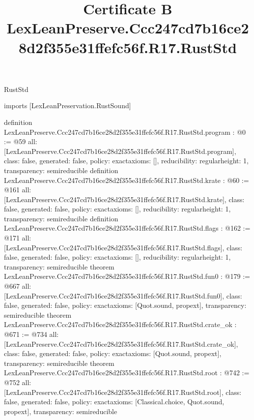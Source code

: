 \begin{lexlean}{RustStd}
\title{Certificate B LexLeanPreserve.Ccc247cd7b16ce28d2f355e31ffefc56f.R17.RustStd}
\begin{coremodule}
imports [LexLeanPreservation.RustSound]

definition LexLeanPreserve.Ccc247cd7b16ce28d2f355e31ffefc56f.R17.RustStd.program : @0 := @59 {
  all: [LexLeanPreserve.Ccc247cd7b16ce28d2f355e31ffefc56f.R17.RustStd.program],
  class: false,
  generated: false,
  policy: exact{axioms: []},
  reducibility: regular{height: 1},
  transparency: semireducible
}
definition LexLeanPreserve.Ccc247cd7b16ce28d2f355e31ffefc56f.R17.RustStd.krate : @60 := @161 {
  all: [LexLeanPreserve.Ccc247cd7b16ce28d2f355e31ffefc56f.R17.RustStd.krate],
  class: false,
  generated: false,
  policy: exact{axioms: []},
  reducibility: regular{height: 1},
  transparency: semireducible
}
definition LexLeanPreserve.Ccc247cd7b16ce28d2f355e31ffefc56f.R17.RustStd.flags : @162 := @171 {
  all: [LexLeanPreserve.Ccc247cd7b16ce28d2f355e31ffefc56f.R17.RustStd.flags],
  class: false,
  generated: false,
  policy: exact{axioms: []},
  reducibility: regular{height: 1},
  transparency: semireducible
}
theorem LexLeanPreserve.Ccc247cd7b16ce28d2f355e31ffefc56f.R17.RustStd.fun0 : @179 := @667 {
  all: [LexLeanPreserve.Ccc247cd7b16ce28d2f355e31ffefc56f.R17.RustStd.fun0],
  class: false,
  generated: false,
  policy: exact{axioms: [Quot.sound, propext]},
  transparency: semireducible
}
theorem LexLeanPreserve.Ccc247cd7b16ce28d2f355e31ffefc56f.R17.RustStd.crate_ok : @671 := @734 {
  all: [LexLeanPreserve.Ccc247cd7b16ce28d2f355e31ffefc56f.R17.RustStd.crate_ok],
  class: false,
  generated: false,
  policy: exact{axioms: [Quot.sound, propext]},
  transparency: semireducible
}
theorem LexLeanPreserve.Ccc247cd7b16ce28d2f355e31ffefc56f.R17.RustStd.root : @742 := @752 {
  all: [LexLeanPreserve.Ccc247cd7b16ce28d2f355e31ffefc56f.R17.RustStd.root],
  class: false,
  generated: false,
  policy: exact{axioms: [Classical.choice, Quot.sound, propext]},
  transparency: semireducible
}


\end{coremodule}
\end{lexlean}
